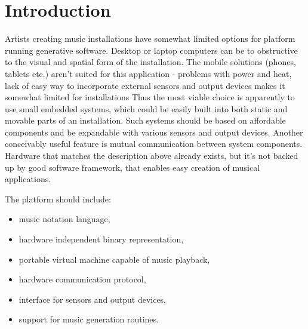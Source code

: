 \documentclass{article}
\title{\papertitle}
\begin{document}
\capstartfalse %
\maketitle %
\capstarttrue %

\begin{abstract}
Application of embedded systems to music installations is limited due to
absence of convenient software development tools. This is a very unfortunate
situation as these systems offer a set of advantages in comparison to desktop
or laptop computers. Embedded systems are small in size therefore easier to
incorporate into the form of the work. These devices are effortlessly
expandable with various sensors and controllers. Moreover they are affordable,
which creates possibility to build networks of cooperating devices.

In this paper we describe a design of Komeda -- the platform for interactive
algorithmic music on embedded systems. The framework consists of language based
on the score-with-blanks approach, the intermediate binary representation,
portable virtual machine and module system.
\end{abstract}
%

\section{Introduction}
\label{sec:introduction}
Artists creating music installations  have somewhat limited options for platform running generative software.
Desktop or laptop computers can be to obstructive to the visual and spatial form of the installation.
The mobile solutions (phones, tablets etc.) aren't suited for this application - problems with power and heat, lack of
easy way to incorporate external sensors and output devices makes it somewhat limited for installations
 Thus the most viable choice is
apparently to use small embedded systems, which could be easily built into both
static and movable parts of an installation. Such systems should be based on
affordable components and be expandable with various sensors and output
devices. Another conceivably useful feature is mutual communication between
system components. Hardware that matches the description above already exists,
but it's not backed up by good software framework, that enables easy creation
of musical applications.

The platform should include:
\begin{itemize}
  \item music notation language,
  \item hardware independent binary representation,
  \item portable virtual machine capable of music playback,
  \item hardware communication protocol,
  \item interface for sensors and output devices,
  \item support for music generation routines.
\end{itemize}
\end{document}
